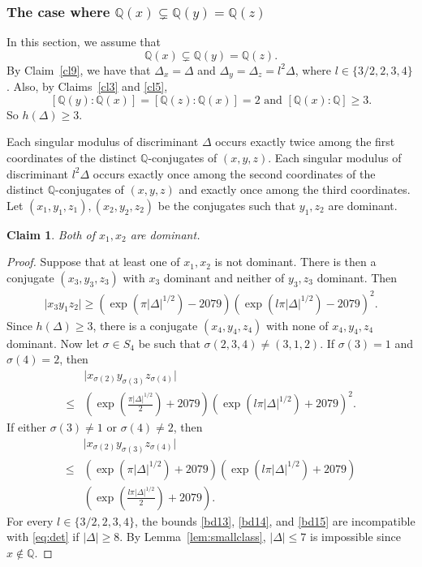 \documentclass[11pt,a4paper, british]{amsart}
\newtheorem{claim}[thm]{Claim}
\theoremstyle{definition}
\theoremstyle{remark}
\numberwithin{equation}{section}
\newcommand{\Q}{\mathbb{Q}} %
\begin{document}
\subsubsection{The case where $\Q(x) \subsetneq \Q(y) = \Q(z)$}\label{subsubsec:subfielddisc}

In this section, we assume that
\[ \Q(x) \subsetneq \Q(y) = \Q(z).\]
By Claim~\ref{cl9}, we have that $\Delta_x = \Delta$ and $\Delta_y = \Delta_z = l^2 \Delta$, where $l \in \{3/2, 2, 3, 4\}$. Also, by Claims~\ref{cl3} and \ref{cl5},
\[ [\Q(y) : \Q(x)] = [\Q(z) : \Q(x)] = 2 \mbox{ and } [\Q(x) : \Q] \geq 3.\]
So $h(\Delta) \geq 3$.

Each singular modulus of discriminant $\Delta$ occurs exactly twice among the first coordinates of the distinct $\Q$-conjugates of $(x, y, z)$. Each singular modulus of discriminant $l^2 \Delta$ occurs exactly once among the second coordinates of the distinct $\Q$-conjugates of $(x, y, z)$ and exactly once among the third coordinates. Let $(x_1, y_1, z_1), (x_2, y_2, z_2)$ be the conjugates such that $y_1, z_2$ are dominant.

\begin{claim}\label{cl12}
	Both of $x_1, x_2$ are dominant.
\end{claim}

\begin{proof}
	Suppose that at least one of $x_1, x_2$ is not dominant. There is then a conjugate $(x_3, y_3, z_3)$ with $x_3$ dominant and neither of $y_3, z_3$ dominant. Then
	\begin{align}\label{bd13}
		\lvert x_3 y_1 z_2 \rvert \geq (\exp(\pi \lvert \Delta \rvert^{1/2}) - 2079)(\exp(l \pi \lvert \Delta \rvert^{1/2}) - 2079)^2.
	\end{align}
	Since $h(\Delta) \geq 3$, there is a conjugate $(x_4, y_4, z_4)$ with none of $x_4, y_4, z_4$ dominant. Now let $\sigma \in S_4$ be such that $\sigma(2, 3, 4) \neq (3, 1, 2)$. If $\sigma(3) = 1$ and $\sigma(4) = 2$, then
	\begin{align}\label{bd14}
		&\lvert x_{\sigma(2)} y_{\sigma(3)} z_{\sigma(4)} \rvert \nonumber \\
		\leq &\left(\exp\left(\frac{\pi \lvert \Delta \rvert^{1/2}}{2}\right) + 2079\right)(\exp(l \pi \lvert \Delta \rvert^{1/2}) + 2079)^2.
	\end{align}
	If either $\sigma(3) \neq 1$ or $\sigma(4) \neq 2$, then
	\begin{align}\label{bd15}
		&\lvert x_{\sigma(2)} y_{\sigma(3)} z_{\sigma(4)} \rvert \nonumber \\ 
		\leq &(\exp(\pi \lvert \Delta \rvert^{1/2}) + 2079)(\exp(l \pi \lvert \Delta \rvert^{1/2}) + 2079) \nonumber \\
		&\left(\exp\left(\frac{l \pi \lvert \Delta \rvert^{1/2}}{2}\right) + 2079\right).
	\end{align}
	For every $l \in \{3/2, 2, 3, 4\}$, the bounds \eqref{bd13}, \eqref{bd14}, and \eqref{bd15} are incompatible with \eqref{eq:det} if $\lvert \Delta \rvert \geq 8$. By Lemma~\ref{lem:smallclass}, $\lvert \Delta \rvert \leq 7$ is impossible since $x \notin \Q$.
\end{proof}
\end{document}
